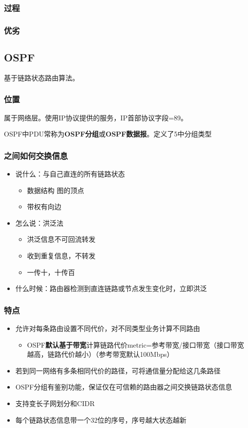 \subsubsection{过程}


\subsubsection{优劣}


\subsection{OSPF}
基于链路状态路由算法。

\subsubsection{位置}
属于网络层。使用IP协议提供的服务，IP首部协议字段=89。

OSPF中PDU常称为\textbf{OSPF分组}或\textbf{OSPF数据报}。定义了5中分组类型


\subsubsection{之间如何交换信息}
\begin{itemize}
    \item 说什么：与自己直连的所有链路状态\begin{itemize}
        \item 数据结构 图的顶点
        \item 带权有向边
    \end{itemize}
    \item 怎么说：洪泛法\begin{itemize}
        \item 洪泛信息不可回流转发
        \item 收到重复信息，不转发
        \item 一传十，十传百
    \end{itemize}
    \item 什么时候：路由器检测到直连链路或节点发生变化时，立即洪泛
\end{itemize}


\subsubsection{特点}
\begin{itemize}
    \item 允许对每条路由设置不同代价，对不同类型业务计算不同路由\begin{itemize}
        \item OSPF\textbf{默认基于带宽}计算链路代价metric=参考带宽/接口带宽（接口带宽越高，链路代价越小）（参考带宽默认100Mbps）
    \end{itemize}
    \item 若到同一网络有多条相同代价的路径，可将通信量分配给这几条路径
    \item OSPF分组有鉴别功能，保证仅在可信赖的路由器之间交换链路状态信息
    \item 支持变长子网划分和CIDR
    \item 每个链路状态信息带一个32位的序号，序号越大状态越新
\end{itemize}


